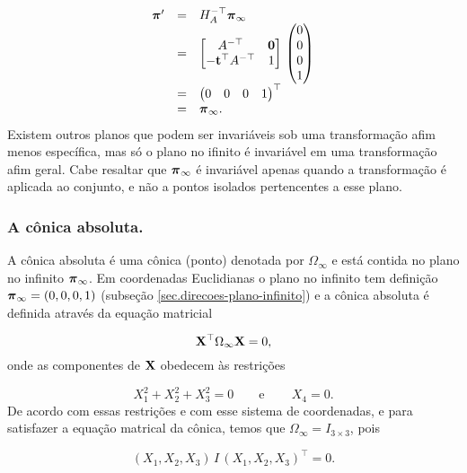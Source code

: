 \begin{equation*}
\begin{array}{rcl}
\boldsymbol{\pi}'&=&H_A^{-\top}\boldsymbol{\pi}_\infty\\
&=&
\begin{bmatrix}
A^{-\top}&{\bf 0}\\
-{\bf t}^\top A^{-\top}&1
\end{bmatrix}\,
\begin{pmatrix}
0\\
0\\
0\\
1
\end{pmatrix}\\
&=&
\begin{pmatrix}
0&0&0&1
\end{pmatrix}^\top\\
&=&
\boldsymbol{\pi}_\infty.
\end{array}
\end{equation*}
Existem outros planos que podem ser invariáveis sob uma transformação afim menos específica, mas só o plano no ifinito é invariável em uma transformação afim geral. Cabe resaltar que $\boldsymbol{\pi}_\infty$ é invariável apenas quando a transformação é aplicada ao conjunto, e não a pontos isolados pertencentes a esse plano.


\subsubsection{A cônica absoluta.}\label{sec.con-absoluta}

A cônica absoluta é uma cônica (ponto) denotada por $\Omega_\infty$ e está contida no plano no infinito $\boldsymbol{\pi}_\infty$. Em coordenadas Euclidianas o plano no infinito tem definição $\boldsymbol{\pi}_\infty=(0,0,0,1)$ (subseção \ref{sec.direcoes-plano-infinito}) e a cônica absoluta é definida através da equação matricial

\begin{equation*}
\mathbf{X}^\top\Omega_\infty\mathbf{X}=0,
\end{equation*} 
onde as componentes de $\mathbf{X}$ obedecem às restrições

\begin{equation*}
X_1^2+X_2^2+X_3^2=0\qquad\text{e}\qquad\,X_4=0.
\end{equation*}
De acordo com essas restrições e com esse sistema de coordenadas, e para satisfazer a equação matrical da cônica, temos que $\Omega_\infty=I_{3\times3}$, pois

\begin{equation*}
(X_1,X_2,X_3)\,I\,(X_1,X_2,X_3)^\top=0.
\end{equation*}

